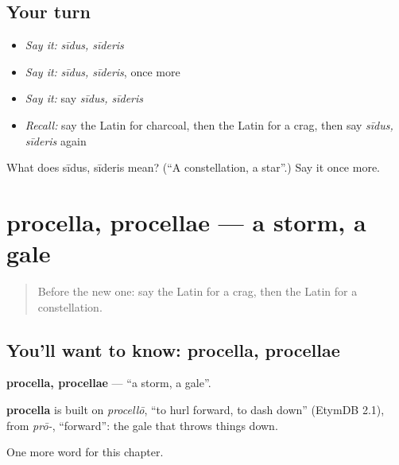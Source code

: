 \subsection*{Your turn}
\begin{itemize}
\raggedright
  \item \emph{Say it:} \emph{sīdus, sīderis}
  \item \emph{Say it:} \emph{sīdus, sīderis}, once more
  \item \emph{Say it:} say \emph{sīdus, sīderis}
  \item \emph{Recall:} say the Latin for charcoal, then the Latin for a crag, then say \emph{sīdus, sīderis} again
\end{itemize}

\begin{tcolorbox}[breakable,colback=teal!4,colframe=teal!35!black,title={Before you move on}]
What does sīdus, sīderis mean? (\textquotedblleft{}A constellation, a star\textquotedblright{}.) Say it once more.
\end{tcolorbox}
\section[procella, procellae]{procella, procellae — a storm, a gale}

\label{lesson:LA-C191-procella}



\begin{quote}
Before the new one: say the Latin for a crag, then the Latin for a constellation.
\end{quote}

\subsection*{You'll want to know: procella, procellae}
\textbf{procella, procellae} — \textquotedblleft{}a storm, a gale\textquotedblright{}.

\begin{cousinweb}
\textbf{procella} is built on \emph{procellō}, \textquotedblleft{}to hurl forward, to dash down\textquotedblright{} (EtymDB 2.1), from \emph{prō-}, \textquotedblleft{}forward\textquotedblright{}: the gale that throws things down.
\end{cousinweb}

\begin{grammarlens}[title={What you've built}]
One more word for this chapter.
\end{grammarlens}

